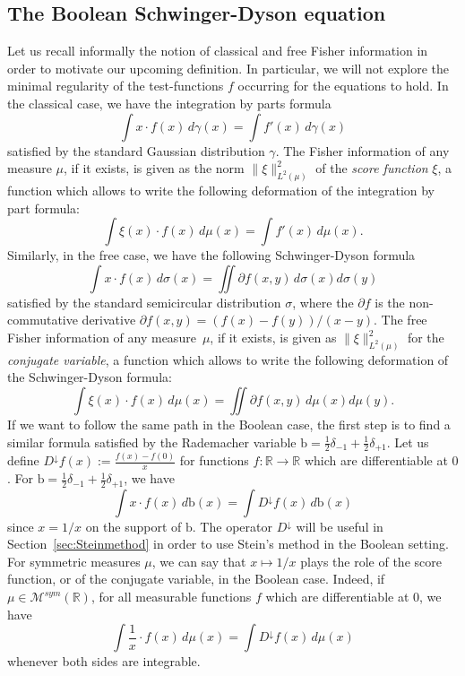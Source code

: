 \documentclass[10pt, reqno]{amsart}
\numberwithin{equation}{section}
\theoremstyle{definition}
\theoremstyle{plain}
\theoremstyle{remark}
\newcommand{\1}{\mathbbm{1}}
\begin{document}
\subsection{The Boolean Schwinger-Dyson equation}\label{sec:Schwinger} Let us recall informally the notion of classical and free Fisher information in order to motivate our upcoming definition. In particular, we will not explore the minimal regularity of the test-functions $f$ occurring for the equations to hold. In the classical case, we have the integration by parts formula
$$\int x\cdot f(x)\,d\gamma(x)=\int f'(x)\,d\gamma(x)$$
satisfied by the standard Gaussian distribution $\gamma$. The Fisher information of any measure $\mu$, if it exists, is given as the norm $\|\xi\|_{L^2(\mu)}^2$ of the \textit{score function} $\xi$, a function which allows to write the following deformation of the integration by part formula:
$$\int \xi(x)\cdot f(x)\,d\mu(x)=\int f'(x)\,d\mu(x).$$
Similarly, in the free case, we have the following Schwinger-Dyson formula
$$\int x\cdot f(x)\,d\sigma(x)=\iint \partial f(x,y)\,d\sigma(x)d\sigma(y)$$
satisfied by the standard semicircular distribution $\sigma$, where the $\partial f$ is the non-commutative derivative $\partial f(x,y)=(f(x)-f(y))/(x-y)$. The free Fisher information of any measure~$\mu$, if it exists, is given as $\|\xi\|_{L^2(\mu)}^2$ for the \textit{conjugate variable}, a function which allows to write the following deformation of the Schwinger-Dyson formula:
$$\int \xi(x)\cdot f(x)\,d\mu(x)=\iint \partial f(x,y)\,d\mu(x)d\mu(y).$$
If we want to follow the same path in the Boolean case, the first step is to find a similar formula satisfied by the Rademacher variable $\mathrm{b}=\frac{1}{2}\delta_{-1}+\frac{1}{2}\delta_{+1}$. Let us define $D^\downarrow f(x):=\frac{f(x)-f(0)}{x}$ for functions $f:\mathbb{R}\to \mathbb{R}$ which are differentiable at $0$. For $\mathrm{b}=\frac{1}{2}\delta_{-1}+\frac{1}{2}\delta_{+1}$, we have
$$\int x\cdot f(x)\,d\mathrm{b}(x)=\int D^\downarrow f(x)\,d\mathrm{b}(x)$$
since $x=1/x$ on the support of $\mathrm{b}$.
The operator $D^\downarrow$ will be useful in Section~\ref{sec:Steinmethod} in order to use Stein's method in the Boolean setting.
For symmetric measures $\mu$, we can say that $x\mapsto 1/x$ plays the role of the score function, or of the conjugate variable,  in the Boolean case. Indeed, if $\mu\in \mathcal{M}^{sym}(\mathbb{R})$, for all measurable functions $f$ which are differentiable at $0$, we have
$$\int \frac{1}{x}\cdot f(x)\,d\mu(x)=\int D^\downarrow f(x)\,d\mu(x)$$
whenever both sides are integrable.
\end{document}
